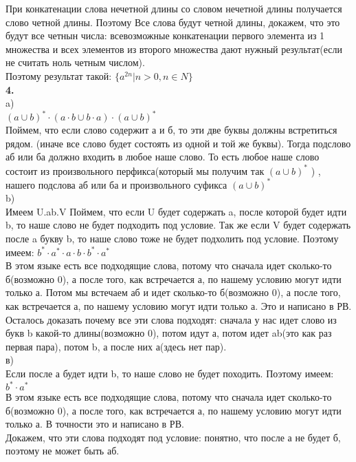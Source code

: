 \documentclass[a4paper,12pt]{article}
\begin{document}
При конкатенации слова нечетной длины со словом нечетной длины получается слово четной длины. Поэтому Все слова будут четной длины, докажем, что это будут все четнын числа: всевозможные конкатенации первого элемента из 1 множества и всех элементов из второго множества дают нужный результат(если не считать ноль четным числом).\\
Поэтому результат такой: {$\lbrace a^{2n} | n>0,n\in N\rbrace$}\\
\textbf{4.}\\
a)\\
$(a\cup b)^*\cdot(a \cdot b \cup b\cdot a) \cdot (a\cup b)^*$\\
Поймем, что если слово содержит а и б, то эти две буквы должны встретиться рядом. (иначе все слово будет состоять из одной и той же буквы). Тогда подслово аб или ба должно входить в любое наше слово. То есть любое наше слово состоит из произвольного перфикса(который мы получим так $(a\cup b)^*$ ) , нашего подслова аб или ба и произвольного суфикса $(a\cup b)^*$ \\
b)\\
Имеем U.ab.V
Поймем, что если U будет содержать a, после которой будет идти b, то наше слово не будет подходить под условие. Так же если V будет содержать после a букву b, то наше слово тоже не будет подхолить под условие. Поэтому имеем: $b^*\cdot a^* \cdot a \cdot b \cdot b^* \cdot a^*$\\
В этом языке есть все подходящие слова, потому что сначала идет сколько-то б(возможно 0), а после того, как встречается а, по нашему условию могут идти только а. Потом мы встечаем аб и идет сколько-то б(возможно 0), а после того, как встречается а, по нашему условию могут идти только а. Это и написано в РВ.\\
Осталось доказать почему все эти слова подходят: сначала у нас идет слово из букв b  какой-то длины(возможно 0), потом идут а, потом идет ab(это как раз первая пара), потом b, а после них а(здесь нет пар).\\
в)\\
Если после а будет идти b, то наше слово не будет походить. Поэтому имеем:$b^*\cdot a^*$\\
В этом языке есть все подходящие слова, потому что сначала идет сколько-то б(возможно 0), а после того, как встречается а, по нашему условию могут идти только а. В точности это и написано в РВ.\\
Докажем, что эти слова подходят под условие: понятно, что после а не будет б, поэтому не может быть аб.\\
\end{document}
